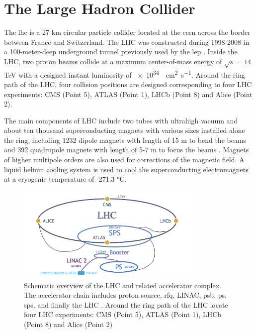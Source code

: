 
\section{The Large Hadron Collider}
\label{sec:cmsexperiment:lhc}

The \acrfull{lhc} \cite{exhep:lhc:Evans:2008zzb} is a 27 km circular particle collider located at the \acrfull{cern} across the border between France and Switzerland. The LHC was constructed during 1998-2008 in a 100-meter-deep underground tunnel previously used by the \acrfull{lep} \cite{exhep:lep:Myers:1991ym}. Inside the LHC, two proton beams collide at a maximum center-of-mass energy of $\sqrt{s}=14$ TeV with a designed instant luminosity of \SI{e34}{\per\cm\squared \per\s}. Around the ring path of the LHC, four collision positions are designed corresponding to four LHC experiments: CMS \cite{exhep:cms:Chatrchyan:2008aa} (Point 5), ATLAS \cite{exhep:atlas:Aad:2008zzm} (Point 1), LHCb \cite{exhep:lhcb:Alves:2008zz} (Point 8) and Alice \cite{exhep:alice:Aamodt:2008zz} (Point 2).


The main components of LHC include two tubes with ultrahigh vacuum and about ten thousand superconducting magnets with various sizes installed alone the ring, including 1232 dipole magnets with length of 15 m to bend the beams and 392 quadrupole magnets with length of 5-7 m to focus the beams \cite{exhep:lhcFactsFigures}. Magnets of higher multipole orders are also used for corrections of the magnetic field. A liquid helium cooling system is used to cool the superconducting electromagnets at a cryogenic temperature of -271.3 \si{\degreeCelsius}. 


\begin{figure}[ht]
    \centering
    \includegraphics[width=0.8\textwidth]{chapters/CMSExperiment/sectionLHC/figures/lhc.png}
    \caption{Schematic overview of the LHC and related accelerator complex. The accelerator chain includes proton source, \acrfull{rfq}, LINAC, \acrfull{psb}, \acrfull{ps}, \acrfull{sps}, and finally the LHC \cite{exhep:lhcInject:Benedikt:2004wm}. Around the ring path of the LHC locate four LHC experiments: CMS \cite{exhep:cms:Chatrchyan:2008aa} (Point 5), ATLAS \cite{exhep:atlas:Aad:2008zzm} (Point 1), LHCb \cite{exhep:lhcb:Alves:2008zz} (Point 8) and Alice \cite{exhep:alice:Aamodt:2008zz} (Point 2)}
    \label{fig:cmsexperiment:lhc:map}
\end{figure}


